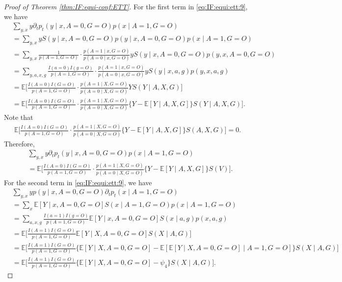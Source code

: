 \documentclass[10pt]{article}
\newcommand{\E}{\mathbb{E}}
\begin{document}
\begin{proof}[Proof of Theorem \ref{thm:IF:equi-conf:ETT}]
For the first term in \eqref{eq:IF:equi:ett:9}, we have
\begin{align*}
&\sum_{y,x} y \partial_t p_t(y\mid x,A=0,G=O)p(x\mid A=1,G=O)\\	
&=\sum_{y,x} y S(y\mid x,A=0,G=O)p(y\mid x,A=0,G=O)p(x\mid A=1,G=O)\\	
&=\sum_{y,x} \frac{1}{p(A=1,G=O)}\cdot \frac{p(A=1\mid x,G=O)}{p(A=0\mid x,G=O)}y S(y\mid x,A=0,G=O)p(y,x,A=0,G=O)\\	
&=\sum_{y,a,x,g} \frac{I(a=0)I(g=O)}{p(A=1,G=O)}\cdot \frac{p(A=1\mid x,G=O)}{p(A=0\mid x,G=O)}y S(y\mid x,a,g)p(y,x,a,g)\\
&=\E\Big[\frac{I(A=0)I(G=O)}{p(A=1,G=O)}\cdot \frac{p(A=1\mid X,G=O)}{p(A=0\mid X,G=O)}Y S(Y\mid A,X,G)\Big]\\	
&=\E\Big[\frac{I(A=0)I(G=O)}{p(A=1,G=O)}\cdot \frac{p(A=1\mid X,G=O)}{p(A=0\mid X,G=O)}\{Y-\E[Y\mid A,X,G]\} S(Y\mid A,X,G)\Big].
\end{align*}
Note that
\begin{align*}
\E\Big[\frac{I(A=0)I(G=O)}{p(A=1,G=O)}\cdot \frac{p(A=1\mid X,G=O)}{p(A=0\mid X,G=O)}\{Y-\E[Y\mid A,X,G]\} S(A,X,G)\Big]=0.
\end{align*}
Therefore,
\begin{equation}
\label{eq:IF:equi:ett:10}
\begin{aligned}
&\sum_{y,x} y \partial_t p_t(y\mid x,A=0,G=O)p(x\mid A=1,G=O)\\
&=\E\Big[\frac{I(A=0)I(G=O)}{p(A=1,G=O)}\cdot \frac{p(A=1\mid X,G=O)}{p(A=0\mid X,G=O)}\{Y-\E[Y\mid A,X,G]\} S(V)\Big].
\end{aligned}
\end{equation}
For the second term in \eqref{eq:IF:equi:ett:9}, we have
{\footnotesize \begin{align*}
&\sum_{y,x} y p(y\mid x,A=0,G=O)\partial_t p_t(x\mid A=1,G=O)\\
&=\sum_{x} \E[Y\mid x,A=0,G=O] S(x\mid A=1,G=O)p(x\mid A=1,G=O)\\
&=\sum_{a,x,g}\frac{I(a=1)I(g=O)}{p(A=1,G=O)} \E[Y\mid x,A=0,G=O] S(x\mid a,g)p(x,a,g)\\
&=\E\Big[\frac{I(A=1)I(G=O)}{p(A=1,G=O)} \E[Y\mid X,A=0,G=O] S(X\mid A,G)\Big]\\
&=\E\Big[\frac{I(A=1)I(G=O)}{p(A=1,G=O)} \{\E[Y\mid X,A=0,G=O]-\E[\E[Y\mid X,A=0,G=O]\mid A=1,G=O]\} S(X\mid A,G)\Big]\\
&=\E\Big[\frac{I(A=1)I(G=O)}{p(A=1,G=O)} \{\E[Y\mid X,A=0,G=O]-\psi_4\} S(X\mid A,G)\Big].
\end{align*}}

\end{proof}
\end{document}
